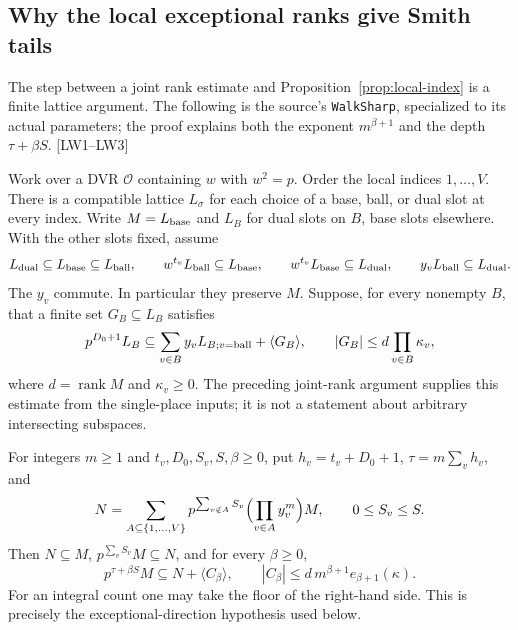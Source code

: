 \subsection{Why the local exceptional ranks give Smith tails}\label{sec:lattice-walk}

The step between a joint rank estimate and Proposition~\ref{prop:local-index} is a finite lattice argument. The following is the source's \texttt{WalkSharp}, specialized to its actual parameters; the proof explains both the exponent $m^{\beta+1}$ and the depth $\tau+\beta S$. \textsf{[LW1--LW3]}

Work over a DVR $\mathcal O$ containing $w$ with $w^2=p$. Order the local indices $1,\ldots,V$. There is a compatible lattice $L_\sigma$ for each choice of a base, ball, or dual slot at every index. Write $M=L_{\rm base}$ and $L_B$ for dual slots on $B$, base slots elsewhere. With the other slots fixed, assume
\[
 L_{\rm dual}\subseteq L_{\rm base}\subseteq L_{\rm ball},\qquad
 w^{t_v}L_{\rm ball}\subseteq L_{\rm base},\qquad
 w^{t_v}L_{\rm base}\subseteq L_{\rm dual},\qquad
 y_vL_{\rm ball}\subseteq L_{\rm dual}.
\]
The $y_v$ commute. In particular they preserve $M$. Suppose, for every nonempty $B$, that a finite set $G_B\subseteq L_B$ satisfies
\begin{equation}\label{eq:walk-joint}
 p^{D_0+1}L_B\subseteq
 \sum_{v\in B}y_vL_{B;v=\rm ball}+\langle G_B\rangle,
 \qquad |G_B|\le d\prod_{v\in B}\kappa_v,
\end{equation}
where $d=\operatorname{rank}M$ and $\kappa_v\ge0$. The preceding joint-rank argument supplies this estimate from the single-place inputs; it is not a statement about arbitrary intersecting subspaces.

For integers $m\ge1$ and $t_v,D_0,S_v,S,\beta\ge0$, put $h_v=t_v+D_0+1$, $\tau=m\sum_vh_v$, and
\[
 N=\sum_{A\subseteq\{1,\ldots,V\}}
 p^{\sum_{v\notin A}S_v}\Bigl(\prod_{v\in A}y_v^m\Bigr)M,
 \qquad 0\le S_v\le S.
\]
Then $N\subseteq M$, $p^{\sum_vS_v}M\subseteq N$, and for every $\beta\ge0$,
\begin{equation}\label{eq:walk-tail}
 p^{\tau+\beta S}M\subseteq N+\langle C_\beta\rangle,
 \qquad |C_\beta|\le d\,m^{\beta+1}e_{\beta+1}(\kappa).
\end{equation}
For an integral count one may take the floor of the right-hand side. This is precisely the exceptional-direction hypothesis used below.

